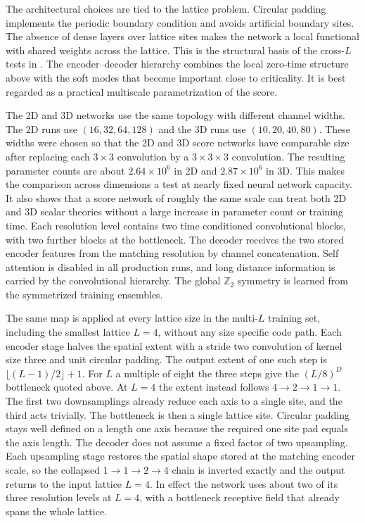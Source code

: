 \documentclass[reprint,twocolumn,superscriptaddress,preprintnumbers,amsmath,amssymb,aps,prd,floatfix]{revtex4-2}
\begin{document}
The architectural choices are tied to the lattice problem.  Circular padding implements the periodic boundary condition and avoids artificial boundary sites. The absence of dense layers over lattice sites makes the network a local functional with shared weights across the lattice.  This is the structural basis of the cross-$L$ tests in .  The encoder--decoder hierarchy combines the local zero-time structure above with the soft modes that become important close to criticality.  It is best regarded as a practical multiscale parametrization of the score.

The 2D and 3D networks use the same topology with different channel widths.  The 2D runs use $(16,32,64,128)$ and the 3D runs use $(10,20,40,80)$.  These widths were chosen so that the 2D and 3D score networks have comparable size after replacing each $3\times3$ convolution by a $3\times3\times3$ convolution.  The resulting parameter counts are about $2.64\times10^6$ in 2D and $2.87\times10^6$ in 3D.  This makes the comparison across dimensions a test at nearly fixed neural network capacity.  It also shows that a score network of roughly the same scale can treat both 2D and 3D scalar theories without a large increase in parameter count or training time.  Each resolution level contains two time conditioned convolutional blocks, with two further blocks at the bottleneck.  The decoder receives the two stored encoder features from the matching resolution by channel concatenation.  Self attention is disabled in all production runs, and long distance information is carried by the convolutional hierarchy.  The global $\mathbb{Z}_2$ symmetry is learned from the symmetrized training ensembles.

The same map is applied at every lattice size in the multi-$L$ training set, including the smallest lattice $L=4$, without any size specific code path.  Each encoder stage halves the spatial extent with a stride two convolution of kernel size three and unit circular padding.  The output extent of one such step is $\lfloor (L-1)/2\rfloor+1$.  For $L$ a multiple of eight the three steps give the $(L/8)^D$ bottleneck quoted above.  At $L=4$ the extent instead follows $4\to2\to1\to1$.  The first two downsamplings already reduce each axis to a single site, and the third acts trivially.  The bottleneck is then a single lattice site.  Circular padding stays well defined on a length one axis because the required one site pad equals the axis length.  The decoder does not assume a fixed factor of two upsampling.  Each upsampling stage restores the spatial shape stored at the matching encoder scale, so the collapsed $1\to1\to2\to4$ chain is inverted exactly and the output returns to the input lattice $L=4$.  In effect the network uses about two of its three resolution levels at $L=4$, with a bottleneck receptive field that already spans the whole lattice.
\end{document}
